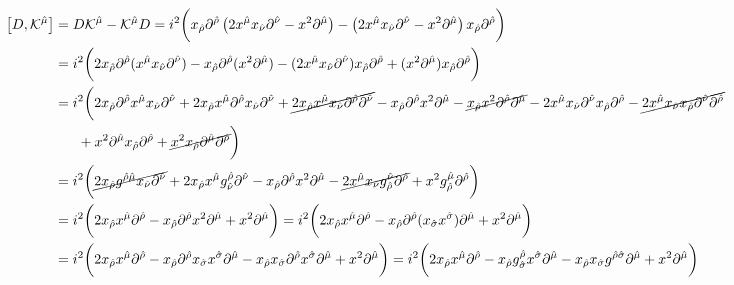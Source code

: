 \documentclass[]{article}
\numberwithin{equation}{section}
\begin{document}
\begin{align}
    \left[D, \mathcal{K}^{\hat{\mu}}\right]&=D\mathcal{K}^{\hat{\mu}}- \mathcal{K}^{\hat{\mu}}D=i^2\bigg(x_{\hat{\rho}}\partial^{\hat{\rho}} \left(2x^{\hat{\mu}}x_{\hat{\nu}}\partial^{\hat{\nu}}-x^2\partial^{\hat{\mu}}\right)-\left(2x^{\hat{\mu}}x_{\hat{\nu}}\partial^{\hat{\nu}}-x^2\partial^{\hat{\mu}}\right)x_{\hat{\rho}}\partial^{\hat{\rho}}\bigg)\\
    &=i^2\bigg(2x_{\hat{\rho}}\partial^{\hat{\rho}}(x^{\hat{\mu}}x_{\hat{\nu}}\partial^{\hat{\nu}})-x_{\hat{\rho}}\partial^{\hat{\rho}}(x^2\partial^{\hat{\mu}})-(2x^{\hat{\mu}}x_{\hat{\nu}}\partial^{\hat{\nu}})x_{\hat{\rho}}\partial^{\hat{\rho}}+(x^2\partial^{\hat{\mu}})x_{\hat{\rho}}\partial^{\hat{\rho}}\bigg)\\
    &=i^2\bigg(2x_{\hat{\rho}}\partial^{\hat{\rho}}x^{\hat{\mu}}x_{\hat{\nu}}\partial^{\hat{\nu}}+2x_{\hat{\rho}}x^{\hat{\mu}}\partial^{\hat{\rho}}x_{\hat{\nu}}\partial^{\hat{\nu}}+\cancel{2x_{\hat{\rho}}x^{\hat{\mu}}x_{\hat{\nu}}\partial^{\hat{\rho}}\partial^{\hat{\nu}}}-x_{\hat{\rho}}\partial^{\hat{\rho}}x^2\partial^{\hat{\mu}}-\cancel{x_{\hat{\rho}}x^2\partial^{\hat{\rho}}\partial^{\hat{\mu}}}-2x^{\hat{\mu}}x_{\hat{\nu}}\partial^{\hat{\nu}}x_{\hat{\rho}}\partial^{\hat{\rho}}-\cancel{2x^{\hat{\mu}}x_{\hat{\nu}}x_{\hat{\rho}}\partial^{\hat{\nu}}\partial^{\hat{\rho}}}\nonumber\\
    &~~~~~+x^2\partial^{\hat{\mu}}x_{\hat{\rho}}\partial^{\hat{\rho}}+\cancel{x^2x_{\hat{\rho}}\partial^{\hat{\mu}}\partial^{\hat{\rho}}}\bigg)\\
    &=i^2\bigg(\cancel{2x_{\hat{\rho}}g^{\hat{\rho}\hat{\mu}}x_{\hat{\nu}}\partial^{\hat{\nu}}}+2x_{\hat{\rho}}x^{\hat{\mu}}g^{\hat{\rho}}_{\hat{\nu}}\partial^{\hat{\nu}}-x_{\hat{\rho}}\partial^{\hat{\rho}}x^2\partial^{\hat{\mu}}-\cancel{2x^{\hat{\mu}}x_{\hat{\nu}}g^{\hat{\nu}}_{\hat{\rho}}\partial^{\hat{\rho}}}+x^2g^{\hat{\mu}}_{\hat{\rho}}\partial^{\hat{\rho}}\bigg)\\
    &=i^2\bigg(2x_{\hat{\rho}}x^{\hat{\mu}}\partial^{\hat{\rho}}-x_{\hat{\rho}}\partial^{\hat{\rho}}x^2\partial^{\hat{\mu}}+x^2\partial^{\hat{\mu}}\bigg)=i^2\bigg(2x_{\hat{\rho}}x^{\hat{\mu}}\partial^{\hat{\rho}}-x_{\hat{\rho}}\partial^{\hat{\rho}}(x_{\hat{\sigma}}x^{\hat{\sigma}})\partial^{\hat{\mu}}+x^2\partial^{\hat{\mu}}\bigg)\\
    &=i^2\bigg(2x_{\hat{\rho}}x^{\hat{\mu}}\partial^{\hat{\rho}}-x_{\hat{\rho}}\partial^{\hat{\rho}}x_{\hat{\sigma}}x^{\hat{\sigma}}\partial^{\hat{\mu}}-x_{\hat{\rho}}x_{\hat{\sigma}}\partial^{\hat{\rho}}x^{\hat{\sigma}}\partial^{\hat{\mu}}+x^2\partial^{\hat{\mu}}\bigg)=i^2\bigg(2x_{\hat{\rho}}x^{\hat{\mu}}\partial^{\hat{\rho}}-x_{\hat{\rho}}g^{\hat{\rho}}_{\hat{\sigma}}x^{\hat{\sigma}}\partial^{\hat{\mu}}-x_{\hat{\rho}}x_{\hat{\sigma}}g^{\hat{\rho}\hat{\sigma}}\partial^{\hat{\mu}}+x^2\partial^{\hat{\mu}}\bigg)\nonumber\\

\end{align}
\end{document}
